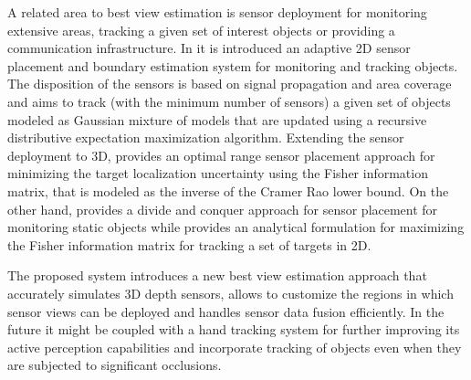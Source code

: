 A related area to best view estimation is sensor deployment for monitoring extensive areas, tracking a given set of interest objects or providing a communication infrastructure. In \cite{Guo2008} it is introduced an adaptive 2D sensor placement and boundary estimation system for monitoring and tracking objects. The disposition of the sensors is based on signal propagation and area coverage and aims to track (with the minimum number of sensors) a given set of objects modeled as Gaussian mixture of models that are updated using a recursive distributive expectation maximization algorithm. Extending the sensor deployment to 3D, \cite{Zhao2013} provides an optimal range sensor placement approach for minimizing the target localization uncertainty using the Fisher information matrix, that is modeled as the inverse of the Cramer Rao lower bound. On the other hand, \cite{Yuan2008} provides a divide and conquer approach for sensor placement for monitoring static objects while \cite{Salinas2013} provides an analytical formulation for maximizing the Fisher information matrix for tracking a set of targets in 2D.

The proposed system introduces a new best view estimation approach that accurately simulates 3D depth sensors, allows to customize the regions in which sensor views can be deployed and handles sensor data fusion efficiently. In the future it might be coupled with a hand tracking system \cite{Hamer2009,Kyriazis2013,Sridhar2016} for further improving its active perception capabilities and incorporate tracking of objects even when they are subjected to significant occlusions.
